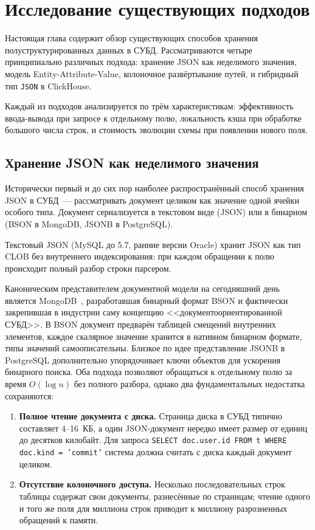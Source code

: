 \chapter{Исследование существующих подходов}

\startrelatedwork

Настоящая глава содержит обзор существующих способов хранения
полуструктурированных данных в СУБД. Рассматриваются четыре
принципиально различных подхода: хранение JSON как неделимого
значения, модель Entity-Attribute-Value, колоночное развёртывание
путей, и гибридный тип \texttt{JSON} в ClickHouse.

Каждый из подходов анализируется по трём характеристикам:
эффективность ввода-вывода при запросе к отдельному полю,
локальность кэша при обработке большого числа строк, и стоимость
эволюции схемы при появлении нового поля.

\section{Хранение JSON как неделимого значения}

Исторически первый и до сих пор наиболее распространённый способ
хранения JSON в СУБД~--- рассматривать документ целиком как
значение одной ячейки особого типа. Документ сериализуется в
текстовом виде (JSON) или в бинарном (BSON в MongoDB, JSONB в
PostgreSQL).

Текстовый JSON (MySQL до 5.7, ранние версии Oracle) хранит JSON как
тип CLOB без внутреннего индексирования: при каждом обращении к полю
происходит полный разбор строки парсером.

Каноническим представителем документной модели на сегодняшний день
является MongoDB~\cite{mongodb-bson}, разработавшая бинарный формат
BSON и фактически закрепившая в индустрии саму концепцию
<<документоориентированной СУБД>>. В BSON документ предварён
таблицей смещений внутренних элементов, каждое скалярное значение
хранится в нативном бинарном формате, типы значений
самоописательны. Близкое по идее представление JSONB в PostgreSQL
дополнительно упорядочивает ключи объектов для ускорения бинарного
поиска. Оба подхода позволяют обращаться к отдельному полю за время
$O(\log n)$ без полного разбора, однако два фундаментальных
недостатка сохраняются:

\begin{enumerate}
    \item \textbf{Полное чтение документа с диска.} Страница диска в
    СУБД типично составляет 4--16~КБ, а один JSON-документ нередко
    имеет размер от единиц до десятков килобайт. Для запроса
    \texttt{SELECT doc.user.id FROM t WHERE doc.kind = 'commit'}
    система должна считать с диска каждый документ целиком.
    \item \textbf{Отсутствие колоночного доступа.} Несколько
    последовательных строк таблицы содержат свои документы,
    разнесённые по страницам; чтение одного и того же поля для
    миллиона строк приводит к миллиону разрозненных обращений к
    памяти.
\end{enumerate}


